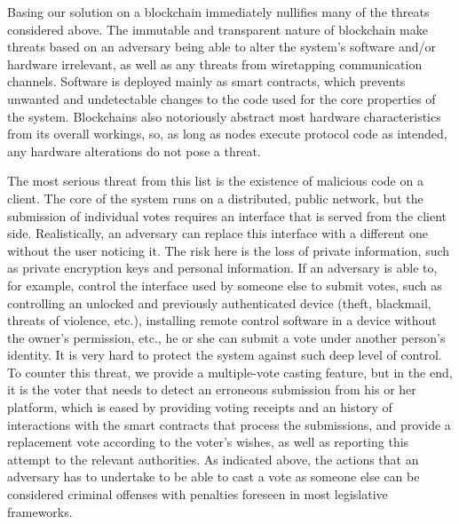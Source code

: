 \documentclass[../main.tex]{subfiles}
\begin{document}
                Basing our solution on a blockchain immediately nullifies many of the threats considered above. The immutable and transparent nature of blockchain make threats based on an adversary being able to alter the system's software and/or hardware irrelevant, as well as any threats from wiretapping communication channels. Software is deployed mainly as smart contracts, which prevents unwanted and undetectable changes to the code used for the core properties of the system. Blockchains also notoriously abstract most hardware characteristics from its overall workings, so, as long as nodes execute protocol code as intended, any hardware alterations do not pose a threat. 
                \par
                The most serious threat from this list is the existence of malicious code on a client. The core of the system runs on a distributed, public network, but the submission of individual votes requires an interface that is served from the client side. Realistically, an adversary can replace this interface with a different one without the user noticing it. The risk here is the loss of private information, such as private encryption keys and personal information. If an adversary is able to, for example, control the interface used by someone else to submit votes, such as controlling an unlocked and previously authenticated device (theft, blackmail, threats of violence, etc.), installing remote control software in a device without the owner's permission, etc., he or she can submit a vote under another person's identity. It is very hard to protect the system against such deep level of control. To counter this threat, we provide a multiple-vote casting feature, but in the end, it is the voter that needs to detect an erroneous submission from his or her platform, which is eased by providing voting receipts and an history of interactions with the smart contracts that process the submissions, and provide a replacement vote according to the voter's wishes, as well as reporting this attempt to the relevant authorities. As indicated above, the actions that an adversary has to undertake to be able to cast a vote as someone else can be considered criminal offenses with penalties foreseen in most legislative frameworks. 
\end{document}
